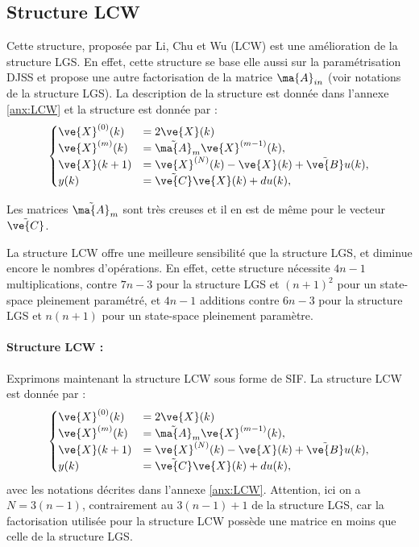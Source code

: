 
\subsection{Structure LCW}

Cette structure, proposée par Li, Chu et Wu (LCW) \cite{LCW07} est une amélioration de la structure LGS. En effet, cette structure se base elle aussi sur la paramétrisation DJSS et propose une autre factorisation de la matrice $\ma{A}_{in}$ (voir notations de la structure LGS). La description de la structure est donnée dans l'annexe \ref{anx:LCW} et la structure est donnée par :
\begin{equation*}
	\begin{cases}
		\ve{X}^{(0)}(k)&=2\ve{X}(k)\\
		\ve{X}^{(m)}(k) & =  \tilde{\ma{A}}_m\ve{X}^{(m-1)}(k),\\
		\ve{X}(k+1) & =  \ve{X}^{(N)}(k)-\ve{X}(k)+\tilde{\ve{B}}u(k) ,\\
		y(k)& =  \tilde{\ve{C}}\ve{X}(k)+du(k),
	\end{cases}
\end{equation*}

Les matrices $\tilde{\ma{A}}_m$ sont très creuses et il en est de même pour le vecteur $ \tilde{\ve{C}}$.

La structure LCW offre une meilleure sensibilité que la structure LGS, et diminue encore le nombres d'opérations. En effet, cette structure nécessite $4n-1$ multiplications, contre $7n-3$ pour la structure LGS et $(n+1)^2$ pour un state-space pleinement paramétré, et $4n-1$ additions contre $6n-3$ pour la structure LGS et $n(n+1)$ pour un state-space pleinement paramètre.


\paragraph{Structure LCW :}

Exprimons maintenant la structure LCW sous forme de SIF. La structure LCW est donnée par :
\begin{equation*}
	\begin{cases}
		\ve{X}^{(0)}(k)&=2\ve{X}(k)\\
		\ve{X}^{(m)}(k) & =  \tilde{\ma{A}}_m\ve{X}^{(m-1)}(k),\\
		\ve{X}(k+1) & =  \ve{X}^{(N)}(k)-\ve{X}(k)+\tilde{\ve{B}}u(k) ,\\
		y(k)& =  \tilde{\ve{C}}\ve{X}(k)+du(k),
	\end{cases}
\end{equation*}
avec les notations décrites dans l'annexe \ref{anx:LCW}. Attention, ici on a $N=3(n-1)$, contrairement au $3(n-1)+1$ de la structure LGS, car la factorisation utilisée pour la structure LCW possède une matrice en moins que celle de la structure LGS.

